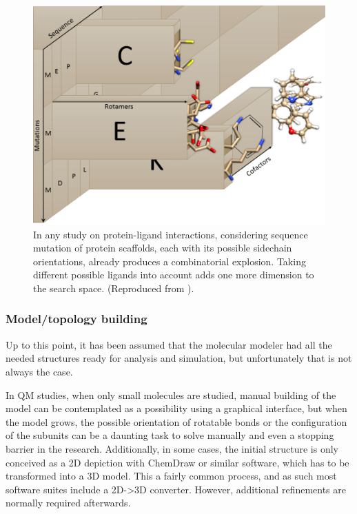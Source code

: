 \begin{figure}[H]
	\includegraphics[width=\textwidth]{./figures/02/chemical_space.png}
	\caption[Chemobiological spaces]{
		In any study on protein-ligand interactions, considering sequence mutation of protein scaffolds, each with its possible sidechain orientations, already produces a combinatorial explosion. Taking different possible ligands into account adds one more dimension to the search space. (Reproduced from \citet{wileybook}).
	}
	\label{fig:chemicalspace}
\end{figure}

\subsubsection{Model/topology building}
Up to this point, it has been assumed that the molecular modeler had all the needed structures ready for analysis and simulation, but unfortunately that is not always the case.

In QM studies, when only small molecules are studied, manual building of the model can be contemplated as a possibility using a graphical interface,\cite{gaussview,avogadro} but when the model grows, the possible orientation of rotatable bonds or the configuration of the subunits can be a daunting task to solve manually and even a stopping barrier in the research. Additionally, in some cases, the initial structure is only conceived as a 2D depiction with ChemDraw or similar software, which has to be transformed into a 3D model. This a fairly common process, and as such most software suites include a 2D->3D converter. However, additional refinements are normally required afterwards.

